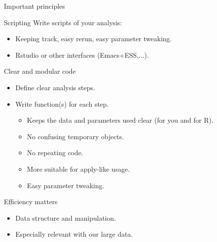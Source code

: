 \documentclass[10pt]{beamer}
\begin{document}

\begin{frame}{Important principles}
  \begin{block}{Scripting}
    Write scripts of your analysis: 
    \begin{itemize}
    \item Keeping track, easy rerun, easy parameter tweaking.
    \item {\sf Rstudio} or other interfaces ({\sf Emacs+ESS},...).
    \end{itemize}
  \end{block}
  \begin{block}{Clear and modular code}
    \begin{itemize}
    \item Define clear analysis steps.
    \item Write function(s) for each step.
      \begin{itemize}
      \item Keeps the data and parameters used clear (for you and for R).
      \item No confusing temporary objects.
      \item No repeating code.
      \item More suitable for {\sf apply}-like usage.
      \item Easy parameter tweaking.
      \end{itemize}
    \end{itemize}
  \end{block}
  \begin{block}{Efficiency matters}
    \begin{itemize}
    \item Data structure and manipulation.
    \item Especially relevant with our large data.
    \end{itemize}

  \end{block}
\end{frame}

\end{document}
